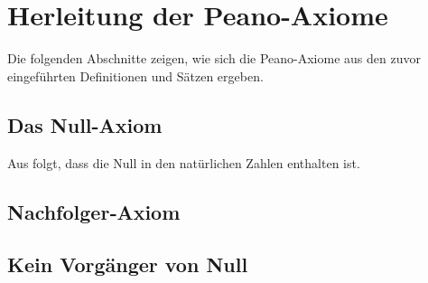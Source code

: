 \documentclass[main.tex]{subfiles}
\begin{document}
\section{Herleitung der Peano-Axiome}

Die folgenden Abschnitte zeigen, wie sich die Peano-Axiome aus den zuvor eingeführten Definitionen und Sätzen ergeben.

\subsection{Das Null-Axiom}

Aus  folgt, dass die Null in den natürlichen Zahlen enthalten ist.

\subsection{Nachfolger‑Axiom}

\begin{tabproof}



\end{tabproof}


\subsection{Kein Vorgänger von Null}

\begin{tabproof}


\end{tabproof}


\end{document}
